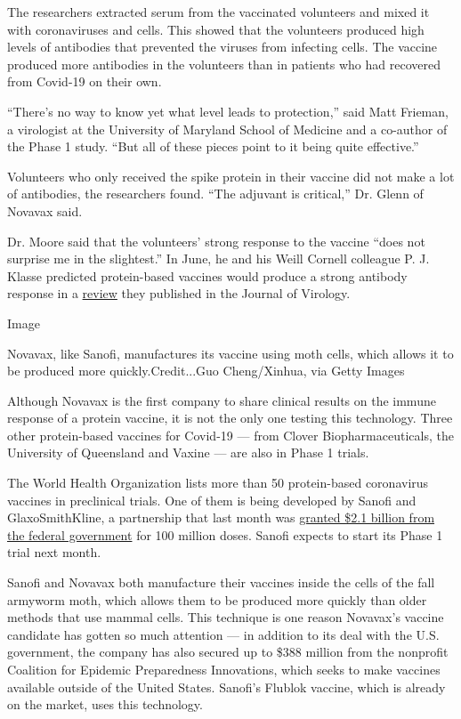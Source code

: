 The researchers extracted serum from the vaccinated volunteers and mixed
it with coronaviruses and cells. This showed that the volunteers
produced high levels of antibodies that prevented the viruses from
infecting cells. The vaccine produced more antibodies in the volunteers
than in patients who had recovered from Covid-19 on their own.

``There's no way to know yet what level leads to protection,'' said Matt
Frieman, a virologist at the University of Maryland School of Medicine
and a co-author of the Phase 1 study. ``But all of these pieces point to
it being quite effective.''

Volunteers who only received the spike protein in their vaccine did not
make a lot of antibodies, the researchers found. ``The adjuvant is
critical,'' Dr. Glenn of Novavax said.

Dr. Moore said that the volunteers' strong response to the vaccine
``does not surprise me in the slightest.'' In June, he and his Weill
Cornell colleague P. J. Klasse predicted protein-based vaccines would
produce a strong antibody response in a
\href{https://jvi.asm.org/content/early/2020/06/26/JVI.01083-20}{review}
they published in the Journal of Virology.

Image

Novavax, like Sanofi, manufactures its vaccine using moth cells, which
allows it to be produced more quickly.Credit...Guo Cheng/Xinhua, via
Getty Images

Although Novavax is the first company to share clinical results on the
immune response of a protein vaccine, it is not the only one testing
this technology. Three other protein-based vaccines for Covid-19 ---
from Clover Biopharmaceuticals, the University of Queensland and Vaxine
--- are also in Phase 1 trials.

The World Health Organization lists more than 50 protein-based
coronavirus vaccines in preclinical trials. One of them is being
developed by Sanofi and GlaxoSmithKline, a partnership that last month
was
\href{https://www.nytimes3xbfgragh.onion/2020/07/31/health/covid-19-vaccine-sanofi-gsk.html}{granted
\$2.1 billion from the federal government} for 100 million doses. Sanofi
expects to start its Phase 1 trial next month.

Sanofi and Novavax both manufacture their vaccines inside the cells of
the fall armyworm moth, which allows them to be produced more quickly
than older methods that use mammal cells. This technique is one reason
Novavax's vaccine candidate has gotten so much attention --- in addition
to its deal with the U.S. government, the company has also secured up to
\$388 million from the nonprofit Coalition for Epidemic Preparedness
Innovations, which seeks to make vaccines available outside of the
United States. Sanofi's Flublok vaccine, which is already on the market,
uses this technology.

